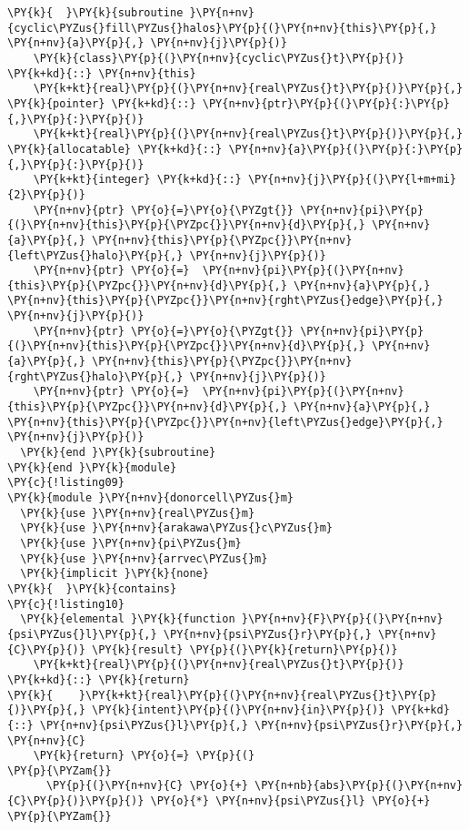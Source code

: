 \begin{Verbatim}[commandchars=\\\{\}]
\PY{k}{  }\PY{k}{subroutine }\PY{n+nv}{cyclic\PYZus{}fill\PYZus{}halos}\PY{p}{(}\PY{n+nv}{this}\PY{p}{,} \PY{n+nv}{a}\PY{p}{,} \PY{n+nv}{j}\PY{p}{)}
    \PY{k}{class}\PY{p}{(}\PY{n+nv}{cyclic\PYZus{}t}\PY{p}{)} \PY{k+kd}{::} \PY{n+nv}{this}
    \PY{k+kt}{real}\PY{p}{(}\PY{n+nv}{real\PYZus{}t}\PY{p}{)}\PY{p}{,} \PY{k}{pointer} \PY{k+kd}{::} \PY{n+nv}{ptr}\PY{p}{(}\PY{p}{:}\PY{p}{,}\PY{p}{:}\PY{p}{)}
    \PY{k+kt}{real}\PY{p}{(}\PY{n+nv}{real\PYZus{}t}\PY{p}{)}\PY{p}{,} \PY{k}{allocatable} \PY{k+kd}{::} \PY{n+nv}{a}\PY{p}{(}\PY{p}{:}\PY{p}{,}\PY{p}{:}\PY{p}{)}
    \PY{k+kt}{integer} \PY{k+kd}{::} \PY{n+nv}{j}\PY{p}{(}\PY{l+m+mi}{2}\PY{p}{)}
    \PY{n+nv}{ptr} \PY{o}{=}\PY{o}{\PYZgt{}} \PY{n+nv}{pi}\PY{p}{(}\PY{n+nv}{this}\PY{p}{\PYZpc{}}\PY{n+nv}{d}\PY{p}{,} \PY{n+nv}{a}\PY{p}{,} \PY{n+nv}{this}\PY{p}{\PYZpc{}}\PY{n+nv}{left\PYZus{}halo}\PY{p}{,} \PY{n+nv}{j}\PY{p}{)} 
    \PY{n+nv}{ptr} \PY{o}{=}  \PY{n+nv}{pi}\PY{p}{(}\PY{n+nv}{this}\PY{p}{\PYZpc{}}\PY{n+nv}{d}\PY{p}{,} \PY{n+nv}{a}\PY{p}{,} \PY{n+nv}{this}\PY{p}{\PYZpc{}}\PY{n+nv}{rght\PYZus{}edge}\PY{p}{,} \PY{n+nv}{j}\PY{p}{)}
    \PY{n+nv}{ptr} \PY{o}{=}\PY{o}{\PYZgt{}} \PY{n+nv}{pi}\PY{p}{(}\PY{n+nv}{this}\PY{p}{\PYZpc{}}\PY{n+nv}{d}\PY{p}{,} \PY{n+nv}{a}\PY{p}{,} \PY{n+nv}{this}\PY{p}{\PYZpc{}}\PY{n+nv}{rght\PYZus{}halo}\PY{p}{,} \PY{n+nv}{j}\PY{p}{)} 
    \PY{n+nv}{ptr} \PY{o}{=}  \PY{n+nv}{pi}\PY{p}{(}\PY{n+nv}{this}\PY{p}{\PYZpc{}}\PY{n+nv}{d}\PY{p}{,} \PY{n+nv}{a}\PY{p}{,} \PY{n+nv}{this}\PY{p}{\PYZpc{}}\PY{n+nv}{left\PYZus{}edge}\PY{p}{,} \PY{n+nv}{j}\PY{p}{)}
  \PY{k}{end }\PY{k}{subroutine}
\PY{k}{end }\PY{k}{module}
\PY{c}{!listing09}
\PY{k}{module }\PY{n+nv}{donorcell\PYZus{}m}
  \PY{k}{use }\PY{n+nv}{real\PYZus{}m}
  \PY{k}{use }\PY{n+nv}{arakawa\PYZus{}c\PYZus{}m}
  \PY{k}{use }\PY{n+nv}{pi\PYZus{}m}
  \PY{k}{use }\PY{n+nv}{arrvec\PYZus{}m}
  \PY{k}{implicit }\PY{k}{none}
\PY{k}{  }\PY{k}{contains} 
\PY{c}{!listing10}
  \PY{k}{elemental }\PY{k}{function }\PY{n+nv}{F}\PY{p}{(}\PY{n+nv}{psi\PYZus{}l}\PY{p}{,} \PY{n+nv}{psi\PYZus{}r}\PY{p}{,} \PY{n+nv}{C}\PY{p}{)} \PY{k}{result} \PY{p}{(}\PY{k}{return}\PY{p}{)}
    \PY{k+kt}{real}\PY{p}{(}\PY{n+nv}{real\PYZus{}t}\PY{p}{)} \PY{k+kd}{::} \PY{k}{return}
\PY{k}{    }\PY{k+kt}{real}\PY{p}{(}\PY{n+nv}{real\PYZus{}t}\PY{p}{)}\PY{p}{,} \PY{k}{intent}\PY{p}{(}\PY{n+nv}{in}\PY{p}{)} \PY{k+kd}{::} \PY{n+nv}{psi\PYZus{}l}\PY{p}{,} \PY{n+nv}{psi\PYZus{}r}\PY{p}{,} \PY{n+nv}{C}
    \PY{k}{return} \PY{o}{=} \PY{p}{(}                                         \PY{p}{\PYZam{}}
      \PY{p}{(}\PY{n+nv}{C} \PY{o}{+} \PY{n+nb}{abs}\PY{p}{(}\PY{n+nv}{C}\PY{p}{)}\PY{p}{)} \PY{o}{*} \PY{n+nv}{psi\PYZus{}l} \PY{o}{+}                           \PY{p}{\PYZam{}}

\end{Verbatim}
